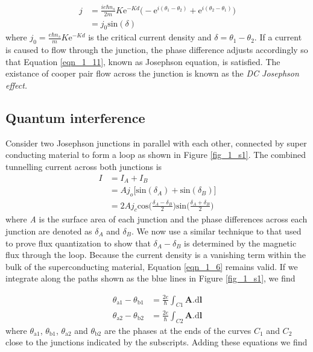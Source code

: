 \begin{equation}
\begin{aligned}
 j &= \frac{ie\hbar n_s}{2m}K\text{e}^{-Kd}\Big(-\text{e}^{i(\theta_1-\theta_2)}+\text{e}^{i(\theta_2-\theta_1)}\Big) \\
 &= j_0\text{sin}(\delta) \label{eqn_1_11}
\end{aligned}
\end{equation} where $j_0 = \frac{e\hbar n_s}{m}K\text{e}^{-Kd}$ is the critical current density and $\delta = \theta_1 - \theta_2$. If a current is caused to flow through the junction, the phase difference adjusts accordingly so that Equation \ref{eqn_1_11}, known as Josephson equation, is satisfied. The existance of cooper pair flow across the junction is known as the \textit{DC Josephson effect.}


\subsection{Quantum interference}
Consider two Josephson junctions in parallel with each other, connected by super conducting material to form a loop as shown in Figure \ref{fig_1_s1}. The combined tunnelling current across both junctions is
\begin{equation}
\begin{aligned}
I &= I_A + I_B \\
&= Aj_o\big[\text{sin}(\delta_A)+\text{sin}(\delta_B)\big] \\
&=2Aj_c\text{cos}\Bigg(\frac{\delta_A-\delta_B}{2}\Bigg)\text{sin}\Bigg(\frac{\delta_A+\delta_B}{2}\Bigg)
\end{aligned} \label{eqn_1_12}
\end{equation} where \textit{A} is the surface area of each junction and the phase differences across each junction are denoted as $\delta_A$ and $\delta_B$. We now use a similar technique to that used to prove flux quantization to show that $\delta_A-\delta_B$ is determined by the magnetic flux through the loop. Because the current density is a vanishing term within the bulk of the superconducting material, Equation \ref{eqn_1_6} remains valid. If we integrate along the paths shown as the blue lines in Figure \ref{fig_1_s1}, we find

\begin{equation}
\begin{aligned}
\theta_{\text{a1}} - \theta_{\text{b1}} &= \frac{2e}{\hbar}\int_{C1} \mathbf{A}.\text{d}\mathbf{l} \\ \theta_{\text{a2}} - \theta_{\text{b2}} &= \frac{2e}{\hbar}\int_{C2} \mathbf{A}.\text{d}\mathbf{l}
\end{aligned} \label{eqn_1_13}
\end{equation} where $\theta_\text{a1}$, $\theta_\text{b1}$, $\theta_\text{a2}$ and $\theta_\text{b2}$ are the phases at the ends of the curves $C_1$ and $C_2$ close to the junctions indicated by the subscripts. Adding these equations we find

